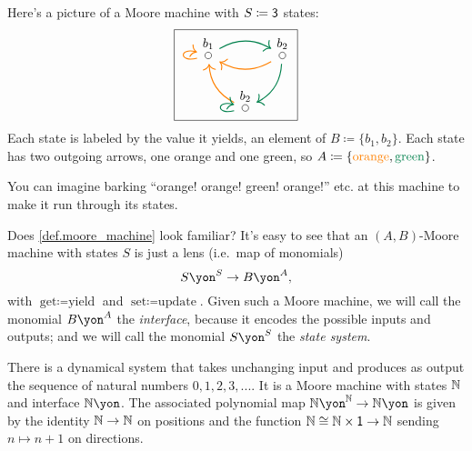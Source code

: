 \documentclass[Book-Poly]{subfiles}
\begin{document}
\begin{example}\label{ex.Moore_three}
Here's a picture of a Moore machine with $S\coloneqq\textsf{3}$ states:
\[
\begin{tikzpicture}
	\node[draw] {
  \begin{tikzcd}[column sep=small]
  	\LMO{b_1}\ar[rr, dgreen, thick, bend left]\ar[loop left, thick, orange]&&
  	\LMO{b_2}\ar[ll, thick, orange, bend left]\ar[dl, bend left, thick, dgreen]\\&
  	\LMO{b_2} \ar[ul, thick, orange, bend left] \ar[loop left, thick, dgreen]
  \end{tikzcd}
  };
\end{tikzpicture}
\]
Each state is labeled by the value it yields, an element of $B\coloneqq\{b_1,b_2\}$. Each state has two outgoing arrows, one orange and one green, so $A\coloneqq\{{\color{orange}\text{orange}},{\color{dgreen}\text{green}}\}$.

You can imagine barking ``orange! orange! green! orange!'' etc. at this machine to make it run through its states.
\end{example}

Does \cref{def.moore_machine} look familiar?
It's easy to see that an $(A,B)$-Moore machine with states $S$ is just a lens (i.e.\ map of monomials)
\[
S\yon^S\to B\yon^A,
\]
with $\text{get} \coloneqq \text{yield}$ and $\text{set} \coloneqq \text{update}$.
Given such a Moore machine, we will call the monomial $B\yon^A$ the \emph{interface}, because it encodes the possible inputs and outputs; and we will call the monomial $S\yon^S$ the \emph{state system}.


\begin{example}\label{ex.counting_trajectory}
There is a dynamical system that takes unchanging input and produces as output the sequence of natural numbers $0,1,2,3,...$. It is a Moore machine with states $\mathbb{N}$ and interface $\nn\yon$. The associated polynomial map $\nn\yon^\nn\to\nn\yon$ is given by the identity $\mathbb{N} \to \mathbb{N}$ on positions and the function $\mathbb{N} \cong \mathbb{N} \times \textsf{1} \to \mathbb{N}$ sending $n\mapsto n+1$ on directions.
\end{example}
\end{document}
